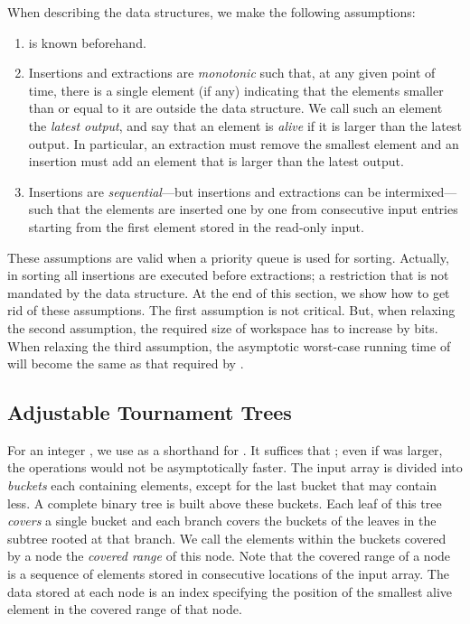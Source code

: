 \documentclass[final,onetabnum,onefignum,onethmnum]{siamltex}
\newcommand{\Insert}{\mbox{}}
\newcommand{\Extract}{\mbox{}}
\begin{document}
When describing the data structures, we
make the following assumptions:
\begin{enumerate}
\item  is known beforehand.
\item Insertions and extractions are \emph{monotonic} such that,
  at any given point of time, there is a single element (if any)
  indicating that the elements smaller than or equal to it are outside
  the data structure.  We call such an element the \emph{latest
    output}, and say that an element is \emph{alive} if it is larger
  than the latest output. In particular, an extraction must remove the
  smallest element and an insertion must add an element that is larger
  than the latest output.
\item Insertions are \emph{sequential}---but insertions and
  extractions can be intermixed---such that the elements are inserted
  one by one from consecutive input entries starting from the first
  element stored in the read-only input.
\end{enumerate}
These assumptions are valid when a priority queue is used
for sorting. Actually, in sorting all insertions are executed before
extractions; a restriction that is not mandated by the data structure.
At the end of this section, we show how to get rid of these
assumptions. The first assumption is not critical. But, 
when relaxing the second assumption, the required size of workspace has to increase by  bits.
When relaxing the third assumption, the asymptotic worst-case running time of \Insert{}
will become the same as that required by \Extract{}.

\subsection{Adjustable Tournament Trees} 
For an integer , we use  as a
shorthand for . It suffices that ; even if  was larger, the
operations would not be asymptotically faster. The input array is
divided into  \emph{buckets} 
each containing  elements, except for the last bucket that may contain less.
A complete binary tree is built above these buckets. Each leaf of
this tree
\emph{covers} a single bucket and each branch covers the
buckets of the leaves in the subtree rooted at that branch. We
call the elements within the buckets covered by a node the
\emph{covered range} of this node. Note that the covered range of a
node is a sequence of elements stored in consecutive locations of the
input array. The data stored at each node is an
index specifying the position of the smallest alive element in the
covered range of that node.
 
\end{document}

